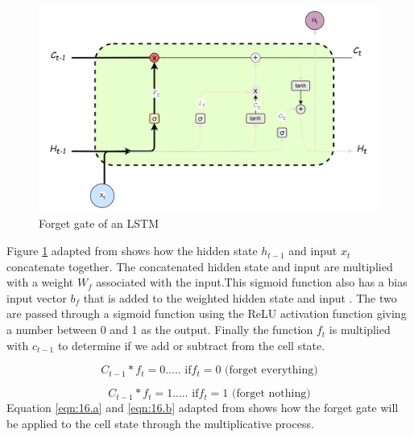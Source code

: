 \begin{figure}[h]
	\centering
	\includegraphics[width=0.7\linewidth]{"Chapters/images/LSTM input gate"}
	\caption{Forget gate of an LSTM}
	\label{fig:forgetgate}
\end{figure}
Figure \ref{fig:forgetgate} adapted from \cite{colah2015understanding} shows how the hidden state $h_{t-1}$ and input $x_t$ concatenate together. The concatenated hidden state and input are multiplied with a weight $W_f$ associated with the input.This sigmoid function also has a bias input vector $b_f$ that is added to the weighted hidden state and input .  The two are passed through a sigmoid function using the ReLU activation function giving a number between 0 and 1 as the output. Finally the function $f_t$ is multiplied with $c_{t-1}$ to determine if we add or subtract from the cell state.

\[
C_{t-1}*f_t = 0   ..... \text{    if} f_t = 0 \text{           (forget everything)}
\label{eqn:16.a}
\]

\[
C_{t-1}*f_t = 1  ..... \text{  if} f_t = 1 \text{            (forget nothing)}
\label{eqn:16.b}
\]
 Equation \ref{eqn:16.a} and \ref{eqn:16.b} adapted from \cite{stryker_ibm_rnn} shows how the forget gate will be applied to the cell state through the multiplicative process.
 
 
